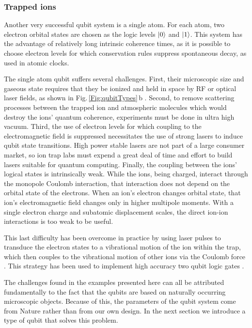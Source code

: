 \subsubsection{Trapped ions}
Another very successful qubit system is a single atom.
For each atom, two electron orbital states are chosen as the logic levels $|0\rangle$ and $|1\rangle$.
This system has the advantage of relatively long intrinsic coherence times, as it is possible to choose electron levels for which conservation rules suppress spontaneous decay, as used in atomic clocks.

The single atom qubit suffers several challenges.
First, their microscopic size and gaseous state requires that they be ionized and held in space by RF or optical laser fields, as shown in Fig.\,\ref{Fig:qubitTypes}\,b \cite{Blatt:review2008}.
Second, to remove scattering processes between the trapped ion and atmospheric molecules which would destroy the ions' quantum coherence, experiments must be done in ultra high vacuum.
Third, the use of electron levels for which coupling to the electromagnetic field is suppressed necessitates the use of strong lasers to induce qubit state transitions.
High power stable lasers are not part of a large consumer market, so ion trap labs must expend a great deal of time and effort to build lasers suitable for quantum computing.
Finally, the coupling between the ions' logical states is intrinsically weak.
While the ions, being charged, interact through the monopole Coulomb interaction, that interaction does not depend on the orbital state of the electrons.
When an ion's electron changes orbital state, that ion's electromagnetic field changes only in higher multipole moments.
With a single electron charge and subatomic displacement scales, the direct ion-ion interactions is too weak to be useful.

This last difficulty has been overcome in practice by using laser pulses to transduce the electron states to a vibrational motion of the ion within the trap, which then couples to the vibrational motion of other ions via the Coulomb force \cite{Sorensen:ions1999}.
This strategy has been used to implement high accuracy two qubit logic gates \cite{Benhelm:towardFaultTolerance2008}.

The challenges found in the examples presented here can all be attributed fundamentally to the fact that the qubits are based on naturally occurring microscopic objects. Because of this, the parameters of the qubit system come from Nature rather than from our own design.
In the next section we introduce a type of qubit that solves this problem.


